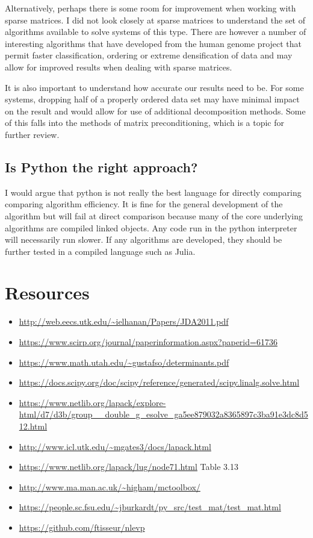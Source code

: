 \documentclass[12pt]{article}
\begin{document}
Alternatively, perhaps there is some room for improvement when working with sparse matrices. I did not look closely at sparse matrices to understand the set of algorithms available to solve systems of this type. There are however a number of interesting algorithms that have developed from the human genome project that permit faster classification, ordering or extreme densification of data and may allow for improved results when dealing with sparse matrices.

It is also important to understand how accurate our results need to be. For some systems, dropping half of a properly ordered data set may have minimal impact on the result and would allow for use of additional decomposition methods. Some of this falls into the methods of matrix preconditioning, which is a topic for further review.

\subsection*{Is Python the right approach?}
I would argue that python is not really the best language for directly comparing comparing algorithm efficiency. It is fine for the general development of the algorithm but will fail at direct comparison because many of the core underlying algorithms are compiled linked objects. Any code run in the python interpreter will necessarily run slower. If any algorithms are developed, they should be further tested in a compiled language such as Julia.


\section*{Resources}
\begin{itemize}
	\item \url{http://web.eecs.utk.edu/~ielhanan/Papers/JDA2011.pdf}
	\item \url{https://www.scirp.org/journal/paperinformation.aspx?paperid=61736}
	\item \url{https://www.math.utah.edu/~gustafso/determinants.pdf}
	\item \url{https://docs.scipy.org/doc/scipy/reference/generated/scipy.linalg.solve.html}
	\item \url{https://www.netlib.org/lapack/explore-html/d7/d3b/group__double_g_esolve_ga5ee879032a8365897c3ba91e3dc8d512.html}
	\item \url{http://www.icl.utk.edu/~mgates3/docs/lapack.html}
	\item \url{https://www.netlib.org/lapack/lug/node71.html} Table 3.13
	\item \url{http://www.ma.man.ac.uk/~higham/mctoolbox/}
	\item \url{https://people.sc.fsu.edu/~jburkardt/py_src/test_mat/test_mat.html}
	\item \url{https://github.com/ftisseur/nlevp}
\end{itemize}
\end{document}
